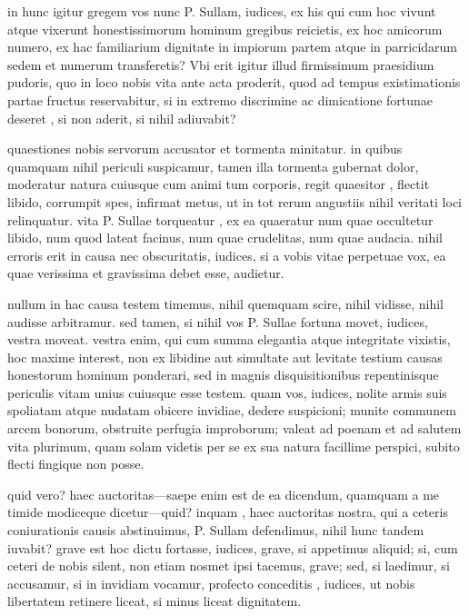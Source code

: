  in hunc igitur gregem vos nunc P. Sullam, iudices, ex his qui cum hoc vivunt atque vixerunt honestissimorum hominum gregibus reicietis, ex hoc amicorum numero, ex hac familiarium dignitate in impiorum partem atque in parricidarum sedem et numerum transferetis? Vbi erit igitur illud firmissimum praesidium pudoris, quo in loco nobis vita ante acta proderit, quod ad tempus existimationis partae fructus reservabitur, si in extremo discrimine ac dimicatione fortunae deseret , si non aderit, si nihil adiuvabit?

 quaestiones nobis servorum accusator et tormenta minitatur. in quibus quamquam nihil periculi suspicamur, tamen illa tormenta gubernat dolor, moderatur natura cuiusque cum animi tum corporis, regit quaesitor , flectit libido, corrumpit spes, infirmat metus, ut in tot rerum angustiis nihil veritati loci relinquatur. vita P. Sullae torqueatur , ex ea quaeratur num quae occultetur libido, num quod lateat facinus, num quae crudelitas, num quae audacia. nihil erroris erit in causa nec obscuritatis, iudices, si a vobis vitae perpetuae vox, ea quae verissima et gravissima debet esse, audietur.

 nullum in hac causa testem timemus, nihil quemquam scire, nihil vidisse, nihil audisse arbitramur. sed tamen, si nihil vos P. Sullae fortuna movet, iudices, vestra moveat. vestra enim, qui cum summa elegantia atque integritate vixistis, hoc maxime interest, non ex libidine aut simultate aut levitate testium causas honestorum hominum ponderari, sed in magnis disquisitionibus repentinisque periculis vitam unius cuiusque esse testem. quam vos, iudices, nolite armis suis spoliatam atque nudatam obicere invidiae, dedere suspicioni; munite communem arcem bonorum, obstruite perfugia improborum; valeat ad poenam et ad salutem vita plurimum, quam solam videtis per se ex sua natura facillime perspici, subito flecti fingique non posse.

 quid vero? haec auctoritas—saepe enim est de ea dicendum, quamquam a me timide modiceque dicetur—quid? inquam , haec auctoritas nostra, qui a ceteris coniurationis causis abstinuimus, P. Sullam defendimus, nihil hunc tandem iuvabit? grave est hoc dictu fortasse, iudices, grave, si appetimus aliquid; si, cum ceteri de nobis silent, non etiam nosmet ipsi tacemus, grave; sed, si laedimur, si accusamur, si in invidiam vocamur, profecto conceditis , iudices, ut nobis libertatem retinere liceat, si minus liceat dignitatem.

